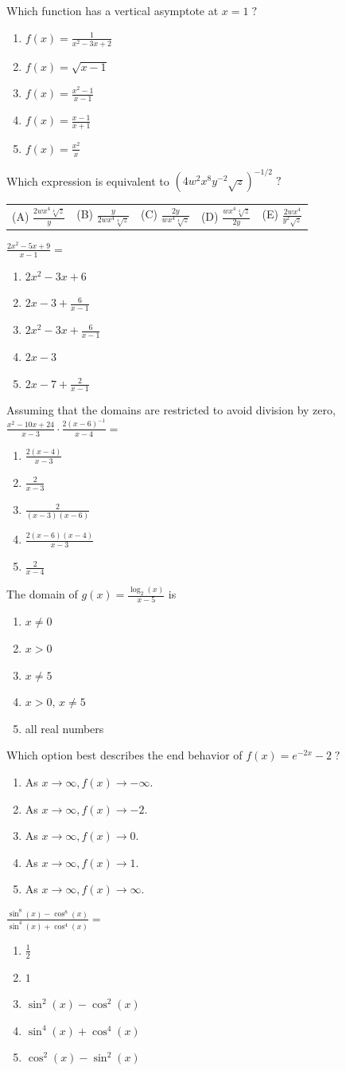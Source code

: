 \documentclass[letterstyle,12pt]{extarticle}
\newcounter{qcounter}
\newcommand{\choices}[5]{
\vspace{0.8em} 
\begin{enumerate}[label=(\Alph*)]
\setlength\itemsep{1em} 
\item
#1 
\item 
#2
\item
#3
\item
#4
\item
#5
\end{enumerate}
}
\newcommand{\choicesline}[5]{    
\vspace{2em} \break 
\begin{tabularx}{0.95 \textwidth} { 
>{\arraybackslash}X 
>{\arraybackslash}X 
>{\arraybackslash}X 
>{\arraybackslash}X 
>{\arraybackslash}X }
(A) \; #1
& 
(B) \; #2
& 
(C) \; #3
& 
(D) \; #4
&
(E) \; #5 
\end{tabularx}
\vspace{2em} \break
}
\newcommand{\ans}[1]{{\color{black} #1}}
\newenvironment{question}
    {\begin{minipage}{0.9 \textwidth}
        \item
    }
    { 
    \end{minipage} \vspace{4ex}
    }
\begin{document}
\begin{list}{\textbf{.}~}{}
\begin{question}
Which function has a vertical asymptote at \(x = 1 \; ?\)
\choices
{\ans{\(f(x) = \frac{1}{x^2 - 3x + 2}\)}}
{\(f(x) = \sqrt{x - 1}\)}
{\(f(x) = \frac{x^2 - 1}{x - 1}\)}
{\(f(x) = \frac{x - 1}{x + 1}\)}
{\(f(x) = \frac{x^2}{x}\)}
\end{question}

\begin{question}
Which expression is equivalent to \(\left(4w^2 x^8 y^{-2} \sqrt z \right)^{-1/2} \; ?\) \\
\choicesline
{\(\frac{2w x^4 \sqrt[4]{z}}{y}\)}
{\ans{\(\frac{y}{2wx^4 \sqrt[4]{z}}\)}}
{\(\frac{2y}{wx^4 \sqrt[4] z}\)}
{\(\frac{wx^4 \sqrt[4] z}{2y}\)}
{\(\frac{2wx^4}{y^2 \sqrt z}\)}
\end{question}

\begin{question}
\(\frac{2x^2 - 5x + 9}{x - 1} = \)
\choices
{\(2x^2 - 3x + 6\)}
{\ans{\(2x - 3 + \frac{6}{x - 1}\)}}
{\(2x^2 - 3x + \frac{6}{x - 1}\)}
{\(2x - 3\)}
{\(2x - 7 + \frac{2}{x - 1}\)}
\end{question}

\begin{question}
Assuming that the domains are restricted to avoid division by zero,    \(\frac{x^2 - 10x + 24}{x - 3} \cdot \frac{2(x - 6)^{-1}}{x - 4} = \)
\choices
{\(\frac{2(x - 4)}{x - 3}\)}
{\ans{\(\frac{2}{x - 3}\)}}
{\(\frac{2}{(x - 3)(x - 6)}\)}
{\(\frac{2(x - 6)(x - 4)}{x - 3}\)}
{\(\frac{2}{x - 4}\)}
\end{question}

\begin{question}
The domain of \(g(x) = \frac{\log_2(x)}{x - 5}\) is 
\choices
{\(x \ne 0\)}
{\(x > 0\)}
{\(x \ne 5\)}
{\ans{\(x > 0, \, x \ne 5\)}}
{all real numbers}
\end{question}

\begin{question}
Which option best describes the end behavior of \(f(x) = e^{-2x} - 2 \; ?\)
\choices
{As \(x \to \infty, f(x) \to -\infty.\)}
{\ans{As \(x \to \infty, f(x) \to -2.\)}}
{As \(x \to \infty, f(x) \to 0.\)}
{As \(x \to \infty, f(x) \to 1.\)}
{As \(x \to \infty, f(x) \to \infty.\)}
\end{question}

\begin{question}
\(\frac{\sin^8(x) - \cos^8(x)}{\sin^4(x) + \cos^4(x)} =\)
\choices
{\(\frac{1}{2}\)}
{\(1\)}
{\ans{\(\sin^2(x) - \cos^2(x)\)}}
{\(\sin^4(x) + \cos^4(x)\)}
{\(\cos^2(x) - \sin^2(x)\)}
\end{question}


\end{list}
\end{document}
